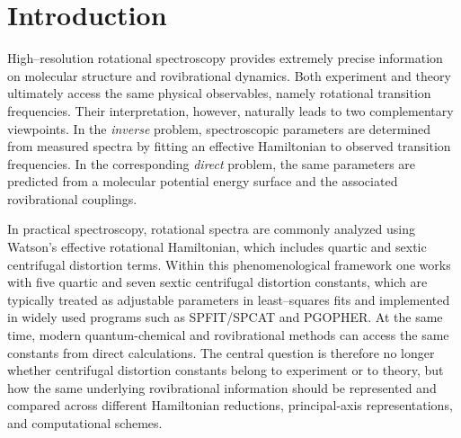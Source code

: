 \documentclass[journal=jacsat,manuscript=article]{achemso}
\begin{document}
\begin{abstract}
This common standard sector provides the natural baseline from which the first
departure from linear representation equivalence can be identified. From the
quantum-chemical point of view, the most important beyond-standard term is in
general the numerically largest one. From the spectroscopic fitting point of
view, however, the crucial term is the first one that breaks linear transport
between representations. On the quartic side, the channel $H_{22}$ is shown to
be the first contribution of this type, because it requires a genuinely new
intrinsic tensorial object beyond the standard first-level structure. On the
sextic side, the corresponding first post-standard candidate is the term
linear in $\tau(H_{22})$ inside the sextic geometry functional. These
quantities are not introduced as complete higher-order corrections, but as
low-cost tensorial diagnostics of both the sensitivity of fitted constants to
representation/reduction choices and the need to move beyond the standard
perturbative sector. The main text is therefore focused on linear
representation transport and its first breakdown, while the detailed tensor
constructions and derivations that justify this structure are collected in the
appendices.
\end{abstract}

\section{Introduction}

High--resolution rotational spectroscopy provides extremely precise
information on molecular structure and rovibrational dynamics.
\cite{TownesSchawlow1955,GordyCook1984,BunkerJensen2005}
Both experiment and theory ultimately access the same physical
observables, namely rotational transition frequencies. Their
interpretation, however, naturally leads to two complementary
viewpoints. In the \emph{inverse} problem, spectroscopic parameters are
determined from measured spectra by fitting an effective Hamiltonian
to observed transition frequencies.
\cite{GordyCook1984,TownesSchawlow1955}
In the corresponding \emph{direct} problem, the same parameters are
predicted from a molecular potential energy surface and the associated
rovibrational couplings.\cite{Dinu2022}

In practical spectroscopy, rotational spectra are commonly analyzed
using Watson's effective rotational Hamiltonian,
\cite{Watson1968,Watson1977}
which includes quartic and sextic centrifugal distortion terms.
Within this phenomenological framework one works with five quartic and
seven sextic centrifugal distortion constants, which are typically
treated as adjustable parameters in least--squares fits and
implemented in widely used programs such as SPFIT/SPCAT and
PGOPHER.\cite{Pickett1991,Western2017}
At the same time, modern quantum-chemical and rovibrational methods
can access the same constants from direct calculations. The central
question is therefore no longer whether centrifugal distortion
constants belong to experiment or to theory, but how the same
underlying rovibrational information should be represented and
compared across different Hamiltonian reductions, principal-axis
representations, and computational schemes.
\end{document}
